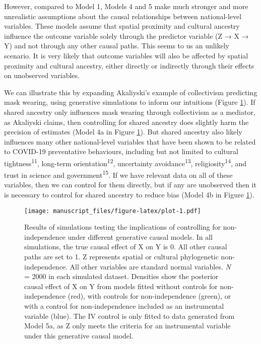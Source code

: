 \documentclass[
  man, donotrepeattitle,floatsintext]{apa6}
\begin{document}
However, compared to Model 1, Models 4 and 5 make much stronger and more
unrealistic assumptions about the causal relationships between
national-level variables. These models assume that spatial proximity and
cultural ancestry influence the outcome variable solely through the
predictor variable (Z → X → Y) and not through any other causal paths. This
seems to us an unlikely scenario. It is very likely that outcome variables
will also be affected by spatial proximity and cultural ancestry, either
directly or indirectly through their effects on unobserved variables.

We can illustrate this by expanding Akaliyski's example of collectivism
predicting mask wearing, using generative simulations to inform our intuitions
(Figure \ref{fig:plot}). If shared ancestry only influences mask
wearing through collectivism as a mediator, as Akaliyski claims, then
controlling for shared ancestry does slightly harm the precision of estimates
(Model 4a in Figure \ref{fig:plot}). But shared ancestry also likely
influences many other national-level variables that have been shown to be
related to COVID-19 preventative behaviours, including but not limited to
cultural tightness\textsuperscript{11}, long-term orientation\textsuperscript{12}, uncertainty
avoidance\textsuperscript{13}, religiosity\textsuperscript{14}, and trust in science
and government\textsuperscript{15}. If we have relevant data on all of these variables,
then we can control for them directly, but if any are unobserved then it is
necessary to control for shared ancestry to reduce bias (Model 4b in Figure
\ref{fig:plot}).



\begin{figure}
\centering
\texttt{[image: manuscript\_files/figure-latex/plot-1.pdf]}
\caption{\label{fig:plot}Results of simulations testing the implications of controlling for non-independence under different generative causal models. In all simulations, the true causal effect of X on Y is 0. All other causal paths are set to 1. Z represents spatial or cultural phylogenetic non-independence. All other variables are standard normal variables. \emph{N} = 2000 in each simulated dataset. Densities show the posterior causal effect of X on Y from models fitted without controls for non-independence (red), with controls for non-independence (green), or with a control for non-independence included as an instrumental variable (blue). The IV control is only fitted to data generated from Model 5a, as Z only meets the criteria for an instrumental variable under this generative causal model.}
\end{figure}
\end{document}
